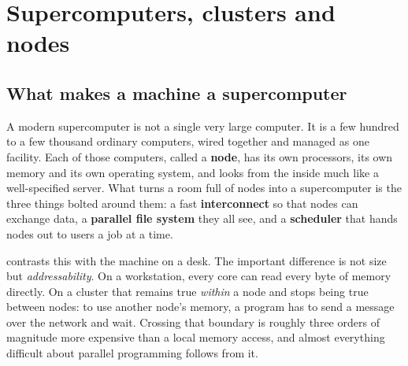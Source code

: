 
\section{Supercomputers, clusters and nodes}
\label{sec:hpc-primer}

\subsection{What makes a machine a supercomputer}

A modern supercomputer is not a single very large computer.  It is a
few hundred to a few thousand ordinary computers, wired together and
managed as one facility.  Each of those computers, called a \textbf{node}, has its own
processors, its own memory and its own operating system, and looks from
the inside much like a well-specified server.  What turns
a room full of nodes into a supercomputer is the three things bolted
around them: a fast \textbf{interconnect} so that nodes can exchange
data, a \textbf{parallel file system} they all see, and a
\textbf{scheduler} that hands nodes out to users a job at a time.

 contrasts this with the machine on
a desk.  The important difference is not size but \emph{addressability}.
On a workstation, every core can read every byte of memory directly.  On
a cluster that remains true \emph{within} a node and stops being true
between nodes: to use another node's memory, a program has to send a
message over the network and wait.  Crossing that boundary is roughly
three orders of magnitude more expensive than a local memory access, and
almost everything difficult about parallel programming follows from it.

